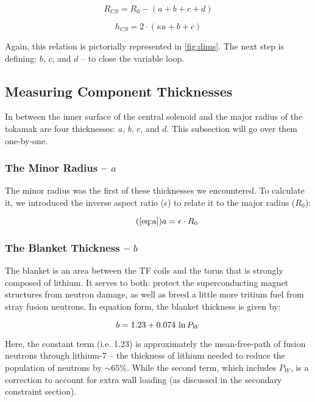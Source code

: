 \begin{equation}
 	\label{eq:rcs1}
 	R_{CS} = R_0 - ( a + b + c + d )
 \end{equation}
 
 \begin{equation}
	\label{eq:hcs1}
 	h_{CS} = 2 \cdot \left ( \kappa a + b + c \right)
 \end{equation}

Again, this relation is pictorially represented in \cref{fig:dims}. The next step is defining: $b$, $c$, and $d$ -- to close the variable loop.

\subsection{Measuring Component Thicknesses}
 
In between the inner surface of the central solenoid and the major radius of the tokamak are four thicknesses: $a$, $b$, $c$, and $d$. This subsection will go over them one-by-one.
 
\subsubsection{The Minor Radius -- $a$}

The minor radius was the first of these thicknesses we encountered. To calculate it, we introduced the inverse aspect ratio ($\epsilon$) to relate it to the major radius ($R_0$):

\begin{equation}
	\tag{\ref{eq:a}}
	a = \epsilon \cdot R_0
\end{equation}
 
\subsubsection{The Blanket Thickness -- $b$}

The blanket is an area between the TF coils and the torus that is strongly composed of lithium. It serves to both: protect the superconducting magnet structures from neutron damage, as well as breed a little more tritium fuel from stray fusion neutrons. In equation form, the blanket thickness is given by: \cite{minervini}

\begin{equation}
	\label{eq:bb}
	b = 1.23 + 0.074 \ \textnormal{ln} \, P_W
\end{equation}

Here, the constant term (i.e. 1.23) is approximately the mean-free-path of fusion neutrons through lithium-7 -- the thickness of lithium needed to reduce the population of neutrons by $\sim 65\%$. While the second term, which includes $P_W$, is a correction to account for extra wall loading (as discussed in the secondary constraint section). 

